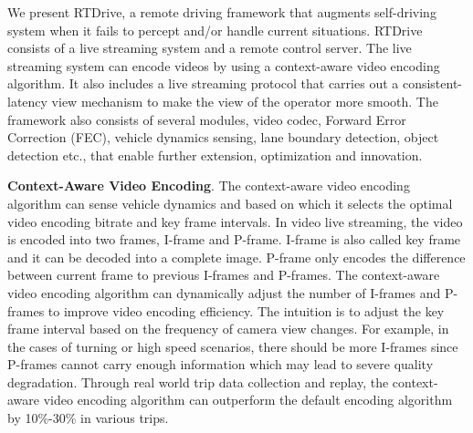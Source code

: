 


We present RTDrive, a remote driving framework
that augments self-driving system when it fails to 
percept and/or handle current situations. 
RTDrive consists of a live streaming system
and a remote control server. 
The live streaming system can encode videos by using
a context-aware video encoding algorithm. 
It also includes a live streaming protocol that 
carries out a consistent-latency
view mechanism to make the view of the operator
more smooth. 
The framework also consists of several modules, video codec, 
Forward Error Correction (FEC), vehicle dynamics sensing,
lane boundary detection, object detection etc.,
that enable further extension, optimization and innovation.  



\textbf{Context-Aware Video Encoding}.
The context-aware video encoding algorithm can 
sense vehicle dynamics and based on which it 
selects the optimal video encoding bitrate and key frame intervals. 
In video live streaming, the video is encoded into two
frames, I-frame and P-frame.
I-frame is also called key frame and it can be 
decoded into a complete image. 
P-frame only encodes the difference between current
frame to previous I-frames and P-frames. 
The context-aware video encoding algorithm
can dynamically adjust the number of I-frames
and P-frames to improve video encoding efficiency. 
The intuition is to adjust the key frame interval 
based on the frequency of camera view changes. 
For example, in the cases of turning or high speed scenarios,
there should be more I-frames since P-frames cannot
carry enough information which may lead to severe quality degradation. 
Through real world trip data collection and replay,
the context-aware video encoding algorithm can outperform
the default encoding algorithm by 10\%-30\% in various trips. 

